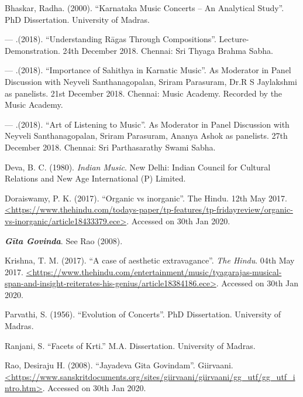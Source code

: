 \begin{thebibliography}{99}
\itemsep=0pt

  Bhaskar, Radha. (2000). “Karnataka Music Concerts – An Analytical Study”. PhD Dissertation. University of Madras.

  — .(2018). “Understanding Rāgas Through Compositions”. Lecture-Demonstration. 24th December 2018. Chennai: Sri Thyaga Brahma Sabha.

  — .(2018). “Importance of Sahithya in Karnatic Music”. As Moderator in Panel Discussion with Neyveli Santhanagopalan, Sriram Parasuram, Dr.R S Jaylakshmi as panelists. 21st December 2018. Chennai: Music Academy. Recorded by the Music Academy.

  — .(2018). “Art of Listening to Music”. As Moderator in Panel Discussion with Neyveli Santhanagopalan, Sriram Parasuram, Ananya Ashok as panelists. 27th December 2018. Chennai: Sri Parthasarathy Swami Sabha.

  Deva, B. C. (1980). \textit{Indian Music}. New Delhi: Indian Council for Cultural Relations and New Age International (P) Limited.

  Doraiswamy, P. K. (2017). “Organic vs inorganic”. The Hindu. 12th May 2017. \url{<https://www.thehindu.com/todays-paper/tp-features/tp-fridayreview/organic-vs-inorganic/article18433379.ece>}. Accessed on 30th Jan 2020.

  \textbf{\textit{Gīta Govinda}}. See Rao (2008).

  Krishna, T. M. (2017). “A case of aesthetic extravagance”. \textit{The Hindu}. 04th May 2017. \url{<https://www.thehindu.com/entertainment/music/tyagarajas-musical-span-and-insight-reiterates-his-genius/article18384186.ece>}. Accessed on 30th Jan 2020.

  Parvathi, S. (1956). “Evolution of Concerts”. PhD Dissertation. University of Madras.

  Ranjani, S. “Facets of Krti.” M.A. Dissertation. University of Madras.

  Rao, Desiraju H. (2008). “Jayadeva Gita Govindam”. Giirvaani. \url{<https://www.sanskritdocuments.org/sites/giirvaani/giirvaani/gg_utf/gg_utf_intro.htm>}. Accessed on 30th Jan 2020.


\end{thebibliography}

